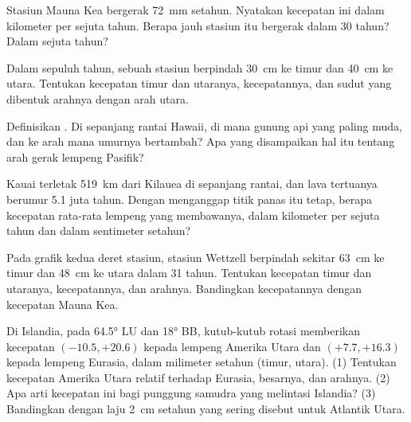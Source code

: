 \begin{exercise}[$\star$]\label{exo:g11:plate-motions:2}
Stasiun Mauna Kea bergerak \qty{72}{mm} setahun. Nyatakan kecepatan ini dalam
kilometer per sejuta tahun. Berapa jauh stasiun itu bergerak dalam 30 tahun?
Dalam sejuta tahun?
\end{exercise}

\begin{exercise}[$\star$]\label{exo:g11:plate-motions:3}
Dalam sepuluh tahun, sebuah stasiun berpindah \qty{30}{cm} ke timur dan
\qty{40}{cm} ke utara. Tentukan kecepatan timur dan utaranya, kecepatannya, dan
sudut yang dibentuk arahnya dengan arah utara.
\end{exercise}

\begin{exercise}[$\star$]\label{exo:g11:plate-motions:4}
Definisikan . Di sepanjang rantai Hawaii, di mana gunung api
yang paling muda, dan ke arah mana umurnya bertambah? Apa yang disampaikan hal
itu tentang arah gerak lempeng Pasifik?
\end{exercise}

\begin{exercise}[$\star$]\label{exo:g11:plate-motions:5}
Kauai terletak \qty{519}{km} dari Kilauea di sepanjang rantai, dan lava
tertuanya berumur \num{5.1} juta tahun. Dengan menganggap titik panas itu tetap,
berapa kecepatan rata-rata lempeng yang membawanya, dalam kilometer per sejuta
tahun dan dalam sentimeter setahun?
\end{exercise}

\begin{exercise}[$\star\star$]\label{exo:g11:plate-motions:6}
Pada grafik kedua deret stasiun, stasiun Wettzell berpindah sekitar
\qty{63}{cm} ke timur dan \qty{48}{cm} ke utara dalam 31 tahun. Tentukan
kecepatan timur dan utaranya, kecepatannya, dan arahnya. Bandingkan kecepatannya
dengan kecepatan Mauna Kea.
\end{exercise}

\begin{exercise}[$\star\star$]\label{exo:g11:plate-motions:7}
Di Islandia, pada \ang{64.5} LU dan \ang{18} BB, kutub-kutub rotasi memberikan
kecepatan $(-10.5, +20.6)$ kepada lempeng Amerika Utara dan $(+7.7, +16.3)$
kepada lempeng Eurasia, dalam milimeter setahun (timur, utara). (1) Tentukan
kecepatan Amerika Utara relatif terhadap Eurasia, besarnya, dan arahnya.
(2) Apa arti kecepatan ini bagi punggung samudra yang melintasi Islandia?
(3) Bandingkan dengan laju \qty{2}{cm} setahun yang sering disebut untuk
Atlantik Utara.
\end{exercise}

